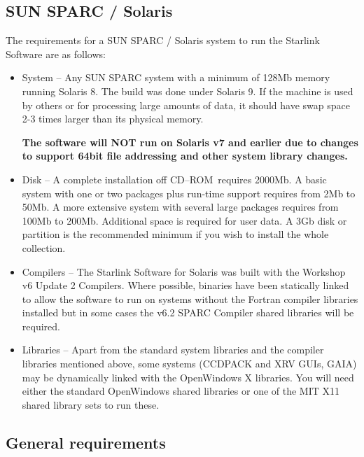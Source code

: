 \documentclass[twoside,11pt]{article}
\newcommand{\xlabel}[1]{}
\renewcommand{\_}{\texttt{\symbol{95}}}
\newcommand{\cdrom}{CD--ROM}
\newcommand{\cdrom}{CD-ROM}
\newcommand{\solfull}{2000Mb}
\begin{document}
\subsection{\xlabel{sun_sparc_solaris}SUN SPARC / Solaris}
\label{sun_sparc_solaris}

The requirements for a SUN SPARC / Solaris system to run the Starlink Software
are as follows:

\begin{itemize}

\item System -- Any SUN SPARC system with a minimum of 128Mb memory running
Solaris 8.  The build was done under Solaris 9.  If the machine is used
by others or for processing large amounts of data, it should have swap
space 2-3 times larger than its physical memory.

\textbf{The software will NOT run on Solaris v7 and earlier
due to changes to support 64bit file addressing and other system library
changes.}

\item Disk -- A complete installation off \cdrom\ requires \solfull.
A basic system with one or two packages plus run-time support requires
from 2Mb to 50Mb.  A more extensive system with several large packages
requires from 100Mb to 200Mb.   Additional space is required for user
data.  A 3Gb disk or partition is the recommended minimum if you wish
to install the whole collection.

\item Compilers -- The Starlink Software for Solaris was built with the
Workshop v6 Update 2 Compilers.  Where possible, binaries have been statically
linked to allow the software to run on systems without the Fortran compiler
libraries installed but in some cases the v6.2 SPARC Compiler shared
libraries will be required.

\item Libraries -- Apart from the standard system libraries and the
compiler libraries mentioned above, some systems (CCDPACK and XRV
GUIs, GAIA) may be dynamically linked with the OpenWindows X libraries.
You will need either the standard OpenWindows shared libraries or one of
the MIT X11 shared library sets to run these.

\end{itemize}

\subsection{\xlabel{general_requirements}General requirements}
\label{general_requirements}
\end{document}
